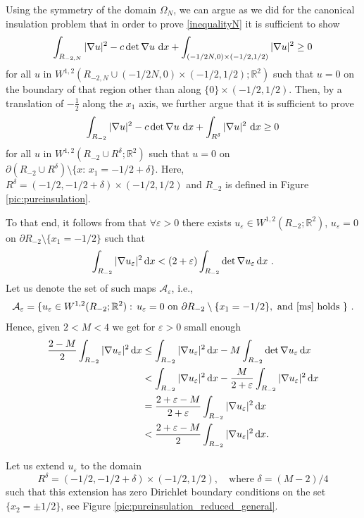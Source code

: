 \documentclass[12pt]{amsart}
\newcommand{\md}{{\rm d}}
\newcommand{\dx}{\, \md x}
\newcommand{\R}{\mathbb{R}}
\newcommand{\om}{\Omega}
\newcommand{\1}{{\bf 1}}
\begin{document}
Using the symmetry of the domain $\om_N$, we can argue as we did for the canonical insulation problem that in order to prove \eqref{inequalityN} it is sufficient to show 
$$\int_{R_{-2,N}}|\nabla u|^2 - c \det \nabla u \, \dx + \int_{(-1/2N,0)\times (-1/2,1/2)} |\nabla u|^2 \geq 0$$
for all $u$ in $W^{1,2}(R_{-2,N}\cup (-1/2N,0)\times (-1/2,1/2);\R^2)$ such that $u=0$ on the boundary of that region other than along $\{0\} \times (-1/2,1/2)$.  Then, by a translation of $-\frac{1}{2}$ along the $x_1$ axis, we further argue that it is sufficient to prove 
$$\int_{R_{-2}}|\nabla u|^2 - c \det \nabla u \, \dx + \int_{R^\delta} |\nabla u|^2 \, \dx \geq 0$$
for all $u$ in $W^{1,2}(R_{-2} \cup R^\delta;\R^2)$ such that $u=0$ on $\partial(R_{-2}\cup R^{\delta})\setminus \{x:\, x_1=-1/2+\delta\}$. Here, $R^\delta=(-1/2,-1/2+\delta)\times(-1/2,1/2)$ and $R_{-2}$ is defined in Figure \ref{pic:pureinsulation}. 





To that end, it follows from \cite{BKV23,mielke-sprenger} that $\forall\varepsilon>0$  there exists $u_\varepsilon\in W^{1,2}(R_{-2};\R^2)$, $u_\varepsilon=0$ on $\partial R_{-2}\setminus \{x_1=-1/2\}$ such that 
\begin{align}\label{ms}
    \int_{R_{-2}}|\nabla u_\varepsilon|^2 \,\md x < (2+\varepsilon)\int_{R_{-2}}\det\nabla u_\varepsilon\,\md x\ .
\end{align}
Let us denote the set of such maps $\mathcal{A}_\varepsilon$, i.e.,
$$\mathcal{A}_\varepsilon=\{u_\varepsilon\in W^{1,2}(R_{-2};\R^2):\, u_\varepsilon=0 \text{ on }\partial R_{-2}\setminus \{x_1=-1/2\}, \text{ and  \eqref{ms} holds }\}\ .$$
Hence, given $2<M<4$ we get for $\varepsilon>0 $ small enough
 \begin{align}\label{lower-upper bound}
   \frac{2-M}{2}\int_{R_{-2}}|\nabla u_\varepsilon|^2 \,\md x&\le \int_{R_{-2}}|\nabla u_\varepsilon|^2 \,\md x -M\int_{R_{-2}}\det\nabla u_\varepsilon\,\md x\nonumber\\\
&    <\int_{R_{-2}}|\nabla u_\varepsilon|^2 \,\md x -\frac{M}{2+\varepsilon} \int_{R_{-2}}|\nabla u_\varepsilon|^2 \,\md x\nonumber\\\
   &= \frac{2+\varepsilon-M}{2+\varepsilon} \int_{R_{-2}}|\nabla u_\varepsilon|^2 \,\md x\nonumber\\
   &<\frac{2+\varepsilon-M}{2} \int_{R_{-2}}|\nabla u_\varepsilon|^2 \,\md x.
\end{align} 

Let us extend $u_\varepsilon$ to the domain $$R^\delta=(-1/2,-1/2+\delta)\times(-1/2,1/2), \quad \text{where } \delta=(M-2)/4 $$ such that this extension has zero Dirichlet boundary conditions on the set $\{x_2=\pm 1/2\}$, see Figure  \ref{pic:pureinsulation_reduced_general}.
\end{document}
